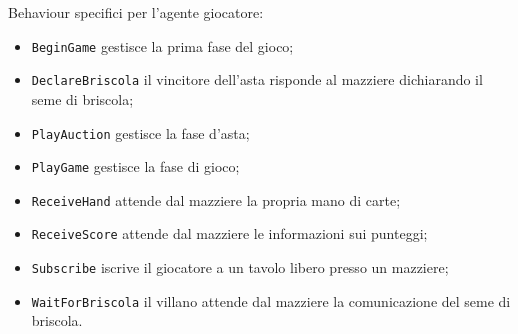Behaviour specifici per l'agente giocatore:

\begin{itemize}
   \item \texttt{BeginGame} gestisce la prima fase del gioco;
   \item \texttt{DeclareBriscola} il vincitore dell'asta risponde al mazziere dichiarando il seme di briscola;
   \item \texttt{PlayAuction} gestisce la fase d'asta;
   \item \texttt{PlayGame} gestisce la fase di gioco;
   \item \texttt{ReceiveHand} attende dal mazziere la propria mano di carte;
   \item \texttt{ReceiveScore} attende dal mazziere le informazioni sui punteggi;
   \item \texttt{Subscribe} iscrive il giocatore a un tavolo libero presso un mazziere;
   \item \texttt{WaitForBriscola} il villano attende dal mazziere la comunicazione del seme di briscola.
\end{itemize}



